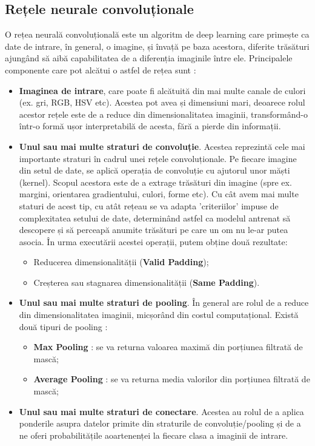 \documentclass[a4paper,12pt]{report}
\begin{document}
    \clearpage
    \subsection{Rețele neurale convoluționale}
    O rețea neurală convoluțională este un algoritm de deep learning care primește ca date de intrare, în general, o imagine, și învață pe baza acestora, diferite trăsături ajungând să aibă capabilitatea de a diferenția imaginile între ele. Principalele componente care pot alcătui o astfel de rețea sunt :
    
    \begin{itemize}
    	\item \textbf{Imaginea de intrare}, care poate fi alcătuită din mai multe canale de culori (ex. gri, RGB, HSV etc). Acestea pot avea și dimensiuni mari, deoarece rolul acestor rețele este de a reduce din dimensionalitatea imaginii, transformând-o într-o formă ușor interpretabilă de acesta, fără a pierde din informații.
    	
    	\item \textbf{Unul sau mai multe straturi de convoluție}. Acestea reprezintă cele mai importante straturi în cadrul unei rețele convoluționale. Pe fiecare imagine din setul de date, se aplică operația de convoluție cu ajutorul unor măști (kernel). Scopul acestora este de a extrage trăsături din imagine (spre ex. margini, orientarea gradientului, culori, forme etc). Cu cât avem mai multe staturi de acest tip, cu atât rețeau se va adapta 'criteriilor' impuse de complexitatea setului de date, determinând astfel ca modelul antrenat să descopere și să perceapă anumite trăsături pe care un om nu le-ar putea asocia. În urma executării acestei operații, putem obține două rezultate:
    	
    	\begin{itemize}
    		\item Reducerea dimensionalității (\textbf{Valid Padding});
    		\item Creșterea sau stagnarea dimensionalității (\textbf{Same Padding}).
    	\end{itemize}
    	
    	\item \textbf{Unul sau mai multe straturi de pooling}. În general are rolul de a reduce din dimensionalitatea imaginii, micșorând din costul computațional. Există două tipuri de pooling :
    	
    	\begin{itemize}
    		\item \textbf{Max Pooling} : se va returna valoarea maximă din porțiunea filtrată de mască;
    		\item \textbf{Average Pooling} : se va returna media valorilor din porțiunea filtrată de mască;
    	\end{itemize} 
    	\item \textbf{Unul sau mai multe straturi de conectare}. Acestea au rolul de a aplica ponderile asupra datelor primite din straturile de convoluție/pooling și de a ne oferi probabilitățile aoartenenței la fiecare clasa a imaginii de intrare.
    \end{itemize}
	
\end{document}
